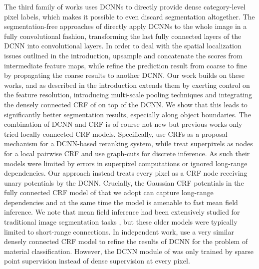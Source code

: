 The third family of works uses DCNNs to directly provide dense category-level pixel labels, which makes it 
possible to even discard segmentation altogether. 
The segmentation-free approaches of
\cite{long2014fully, eigen2014predicting} directly apply DCNNs to the whole
image in a fully convolutional fashion, transforming the last fully connected
layers of the DCNN into convolutional layers. In order to deal with the spatial
localization issues outlined in the introduction, \cite{long2014fully} upsample
and concatenate the scores from intermediate feature maps, while
\cite{eigen2014predicting} refine the prediction result from coarse to fine by
propagating the coarse results to another DCNN.
Our work builds on  these works, and as described in the introduction 
extends them by exerting control on the feature resolution, introducing multi-scale pooling techniques
and integrating  the
densely connected CRF of \cite{krahenbuhl2011efficient} on top of the DCNN. We
show that this leads to significantly better segmentation results, especially
along object boundaries. The combination of DCNN and CRF is of course not new
but previous works only tried locally connected CRF models. Specifically,
\cite{cogswell2014combining} use CRFs as a proposal mechanism for a DCNN-based
reranking system, while \cite{farabet2013learning} treat superpixels as nodes
for a local pairwise CRF and use graph-cuts for discrete inference. As such
their models were limited by errors in superpixel computations or ignored
long-range dependencies. Our approach instead treats every pixel as a CRF node
receiving unary potentials by the DCNN. Crucially, the Gaussian CRF potentials
in the fully connected CRF model of \cite{krahenbuhl2011efficient} that we adopt
can capture long-range dependencies and at the same time the model is amenable
to fast mean field inference. We note that mean field inference had been
extensively studied for traditional image segmentation tasks
\cite{geiger1991parallel, geiger1991common, kokkinos2008computational}, but
these older models were typically limited to short-range connections. In
independent work, \cite{bell2014material} use a very similar densely connected
CRF model to refine the results of DCNN for the problem of material
classification. However, the DCNN module of \cite{bell2014material} was only
trained by sparse point supervision instead of dense supervision at every pixel.

